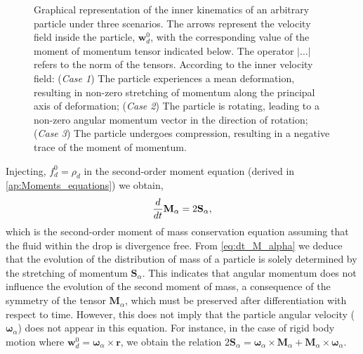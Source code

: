\begin{figure}[h!]
    \hfill
    \caption{Graphical representation of the inner kinematics   of an arbitrary particle under three scenarios. 
        The arrows represent the velocity field inside the particle, $\textbf{w}_d^0$, with the corresponding value of the moment of momentum tensor indicated below. 
        The operator $|\ldots|$ refers to the norm of the tensors. 
        According to the inner velocity field:
        (\textit{Case 1}) The particle experiences a mean deformation, resulting in non-zero stretching of momentum along the principal axis of deformation;
        (\textit{Case 2}) The particle is rotating, leading to a non-zero angular momentum vector in the direction of rotation;
        (\textit{Case 3}) The particle undergoes compression, resulting in a negative trace of the moment of momentum.
    }
    \label{eq:scheme}
\end{figure}
Injecting, $f_d^0 = \rho_d$ in the second-order moment equation (derived in \ref{ap:Moments_equations}) we obtain,
\begin{equation}
    \ddt {\textbf{M}_\alpha}=2\textbf{S}_\alpha, %
    \label{eq:dt_M_alpha}
\end{equation}
which is the second-order moment of mass conservation equation assuming that the fluid within the drop is divergence free. 
From \ref{eq:dt_M_alpha} we deduce that the evolution of the distribution of mass of a particle is solely determined by the stretching of momentum $\textbf{S}_\alpha$. 
This indicates that angular momentum does not influence the evolution of the second moment of mass, a consequence of the symmetry of the tensor $\textbf{M}_\alpha$, which must be preserved after differentiation with respect to time.
However, this does not imply that the particle angular velocity ($\bm\omega_\alpha$) does not appear in this equation. 
For instance, in the case of rigid body motion where $\textbf{w}_d^0 = \bm\omega_\alpha \times \textbf{r}$, we obtain the relation  $2\textbf{S}_\alpha = \bm\omega_\alpha \times \textbf{M}_\alpha+ \textbf{M}_\alpha\times \bm\omega_\alpha $. 

